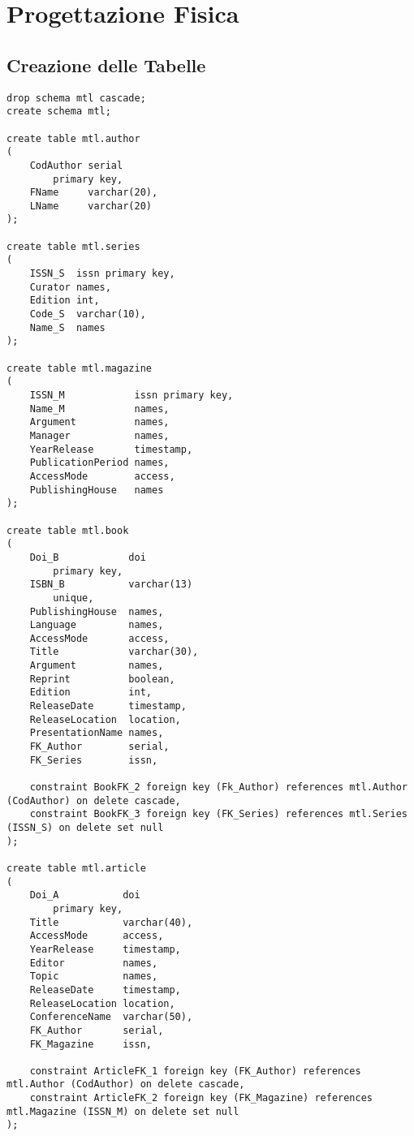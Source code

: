 \chapter{Progettazione Fisica}
\section{Creazione delle Tabelle}
\begin{lstlisting}
drop schema mtl cascade;
create schema mtl;

create table mtl.author
(
    CodAuthor serial
        primary key,
    FName     varchar(20),
    LName     varchar(20)
);

create table mtl.series
(
    ISSN_S  issn primary key,
    Curator names,
    Edition int,
    Code_S  varchar(10),
    Name_S  names
);

create table mtl.magazine
(
    ISSN_M            issn primary key,
    Name_M            names,
    Argument          names,
    Manager           names,
    YearRelease       timestamp,
    PublicationPeriod names,
    AccessMode        access,
    PublishingHouse   names
);

create table mtl.book
(
    Doi_B            doi
        primary key,
    ISBN_B           varchar(13)
        unique,
    PublishingHouse  names,
    Language         names,
    AccessMode       access,
    Title            varchar(30),
    Argument         names,
    Reprint          boolean,
    Edition          int,
    ReleaseDate      timestamp,
    ReleaseLocation  location,
    PresentationName names,
    FK_Author        serial,
    FK_Series        issn,

    constraint BookFK_2 foreign key (Fk_Author) references mtl.Author (CodAuthor) on delete cascade,
    constraint BookFK_3 foreign key (FK_Series) references mtl.Series (ISSN_S) on delete set null
);

create table mtl.article
(
    Doi_A           doi
        primary key,
    Title           varchar(40),
    AccessMode      access,
    YearRelease     timestamp,
    Editor          names,
    Topic           names,
    ReleaseDate     timestamp,
    ReleaseLocation location,
    ConferenceName  varchar(50),
    FK_Author       serial,
    FK_Magazine     issn,

    constraint ArticleFK_1 foreign key (FK_Author) references mtl.Author (CodAuthor) on delete cascade,
    constraint ArticleFK_2 foreign key (FK_Magazine) references mtl.Magazine (ISSN_M) on delete set null
);
\end{lstlisting}

